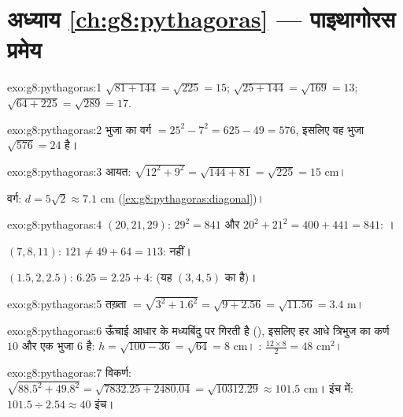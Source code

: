 \section*{अध्याय \ref{ch:g8:pythagoras} --- पाइथागोरस प्रमेय}

\begin{solution}{exo:g8:pythagoras:1}
$\sqrt{81 + 144} = \sqrt{225} = 15$; \quad
$\sqrt{25 + 144} = \sqrt{169} = 13$; \quad
$\sqrt{64 + 225} = \sqrt{289} = 17$.
\end{solution}

\begin{solution}{exo:g8:pythagoras:2}
 भुजा का वर्ग $= 25^2 - 7^2 = 625 - 49 = 576$, इसलिए वह भुजा
$\sqrt{576} = 24$ है।
\end{solution}

\begin{solution}{exo:g8:pythagoras:3}
आयत: $\sqrt{12^2 + 9^2} = \sqrt{144 + 81} = \sqrt{225} = 15$
cm।

वर्ग: $d = 5\sqrt2 \approx 7.1$ cm
(\cref{ex:g8:pythagoras:diagonal})।
\end{solution}

\begin{solution}{exo:g8:pythagoras:4}
$(20, 21, 29)$: $29^2 = 841$ और $20^2 + 21^2 = 400 + 441 = 841$:
।

$(7, 8, 11)$: $121 \neq 49 + 64 = 113$:  नहीं।

$(1.5, 2, 2.5)$: $6.25 = 2.25 + 4$:  (यह $(3,4,5)$ का 
है)।
\end{solution}

\begin{solution}{exo:g8:pythagoras:5}
तख़्ता $= \sqrt{3^2 + 1.6^2} = \sqrt{9 + 2.56} = \sqrt{11.56} = 3.4$
m।
\end{solution}

\begin{solution}{exo:g8:pythagoras:6}
ऊँचाई आधार के मध्यबिंदु पर गिरती है (), इसलिए हर
आधे त्रिभुज का कर्ण $10$ और एक  भुजा $6$ है:
$h = \sqrt{100 - 36} = \sqrt{64} = 8$ cm। :
$\frac{12 \times 8}{2} = 48$ cm$^2$।
\end{solution}

\begin{solution}{exo:g8:pythagoras:7}
विकर्ण: $\sqrt{88.5^2 + 49.8^2} = \sqrt{7832.25 + 2480.04}
= \sqrt{10312.29} \approx 101.5$ cm। इंच में:
$101.5 \div 2.54 \approx 40$ इंच।
\end{solution}

